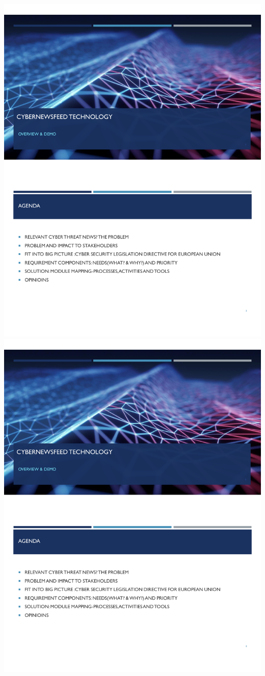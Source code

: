 \includegraphics[page=1,scale=0.75]{Appendices/GSS-Threat Brief PPT.pdf} 
\includegraphics[page=2,scale=0.75]{Appendices/GSS-Threat Brief PPT.pdf} 
